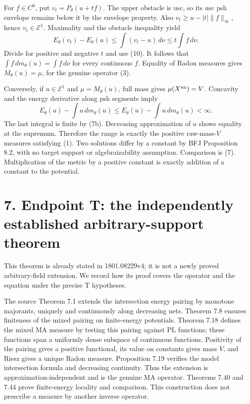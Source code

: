 \documentclass[11pt]{article}
\begin{document}
For \(f\in C^0\), put \(v_t=P_\theta(u+tf)\). The upper obstacle is usc, so its usc psh envelope remains below it by the envelope property. Also \(v_t\geq u-|t|\|f\|_\infty\), hence \(v_t\in\mathcal E^1\). Maximality and the obstacle inequality yield
\[
 E_\theta(v_t)-E_\theta(u)
 \leq\int(v_t-u)\,d\nu\leq t\int f\,d\nu.
 \tag{17}
\]
Divide for positive and negative \(t\) and use (10). It follows that \(\int f\,dm_\theta(u)=\int f\,d\nu\) for every continuous \(f\). Equality of Radon measures gives \(M_\theta(u)=\mu\), for the genuine operator (3).

Conversely, if \(u\in\mathcal E^1\) and \(\mu=M_\theta(u)\), full mass gives \(\mu(X^{\rm an})=V\). Concavity and the energy derivative along psh segments imply
\[
 E_\theta(a)-\int a\,dm_\theta(u)
 \leq E_\theta(u)-\int u\,dm_\theta(u)<\infty.
\]
The last integral is finite by (7b). Decreasing approximation of \(u\) shows equality at the supremum. Therefore the range is exactly the positive raw-mass-\(V\) measures satisfying (1). Two solutions differ by a constant by BFJ Proposition 8.2, with no target support or algebraizability assumption. Comparison is (7). Multiplication of the metric by a positive constant is exactly addition of a constant to the potential.

\section*{7. Endpoint T: the independently established arbitrary-support theorem}

This theorem is already stated in 1801.08229v4; it is not a newly proved arbitrary-field extension. We record how its proof covers the operator and the equation under the precise T hypotheses.

The source Theorem 7.1 extends the intersection energy pairing by monotone majorants, uniquely and continuously along decreasing nets. Theorem 7.8 ensures finiteness of the mixed pairing on finite-energy potentials. Theorem 7.18 defines the mixed MA measure by testing this pairing against PL functions; these functions span a uniformly dense subspace of continuous functions. Positivity of the pairing gives a positive functional, its value on constants gives mass \(V\), and Riesz gives a unique Radon measure. Proposition 7.19 verifies the model intersection formula and decreasing continuity. Thus the extension is approximation-independent and is the genuine MA operator. Theorems 7.40 and 7.44 prove finite-energy locality and comparison. This construction does not prescribe a measure by another inverse operator.
\end{document}
